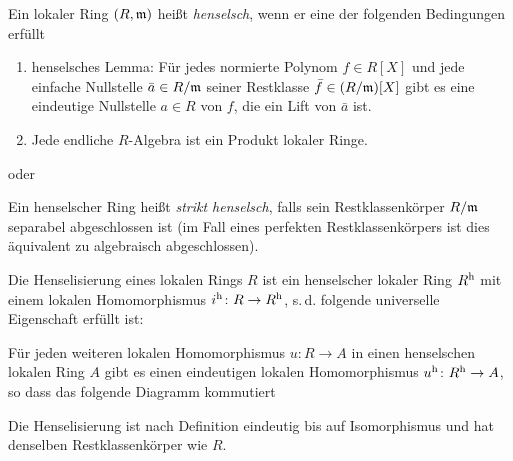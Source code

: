 \documentclass[german]{scrreprt}
\begin{document}
\begin{Definition}\label{def:henselscheringe}
  Ein lokaler Ring $(R,\mathfrak{m})$ heißt \emph{henselsch}, wenn
  er eine der folgenden Bedingungen erfüllt
  \begin{enumerate}[label=(\roman*)]
  \item henselsches Lemma:
    Für jedes normierte Polynom $f\in R[X]$ und jede einfache Nullstelle
    $\bar a\in R/\mathfrak{m}$ seiner Restklasse $\bar f\in (R/\mathfrak{m})[X]$
    gibt es eine eindeutige Nullstelle $a\in R$ von $f$, die ein Lift
    von $\bar a$ ist.
  \item Jede endliche $R$-Algebra ist ein Produkt lokaler Ringe.
  \end{enumerate}
  \cite[2.3, Proposition 4]{neron}
  oder \cite[vgl.][Chapter IV.6]{silverman2}
  
  Ein henselscher Ring heißt \emph{strikt henselsch}, falls sein
  Restklassenkörper $R/\mathfrak{m}$ separabel abgeschlossen ist
  (im Fall eines perfekten Restklassenkörpers ist dies äquivalent zu
  algebraisch abgeschlossen).
\end{Definition}

\begin{Definition}[Henselisierung]\label{def:henselisierung}
  Die Henselisierung eines lokalen Rings $R$ ist ein henselscher
  lokaler Ring $R^{\text{h}}$ mit einem lokalen Homomorphismus
  $i^\text{h}\colon R\to R^{\text{h}}$, s.\,d. folgende universelle Eigenschaft
  erfüllt ist:
  
  Für jeden weiteren lokalen Homomorphismus $u\colon R\to A$ in einen
  henselschen lokalen Ring $A$ gibt es einen eindeutigen lokalen
  Homomorphismus $u^\text{h}\colon R^{\text{h}}\to A$, so dass das folgende Diagramm
  kommutiert
  \begin{center}
  \end{center}
  \cite[2.3, Definition 6]{neron}

  Die Henselisierung ist nach Definition eindeutig bis auf
  Isomorphismus und hat denselben Restklassenkörper wie $R$.
  \cite[Chapter 2.3, S. 47]{neron}
\end{Definition}
\end{document}
